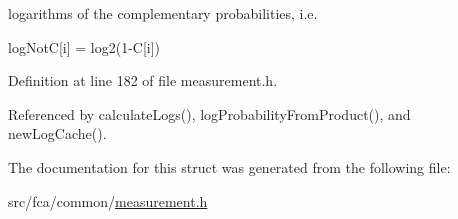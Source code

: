 logarithms of the complementary probabilities, i.\-e. 

log\-Not\-C\mbox{[}i\mbox{]} = log2(1-\/\-C\mbox{[}i\mbox{]}) 

\-Definition at line 182 of file measurement.\-h.



\-Referenced by calculate\-Logs(), log\-Probability\-From\-Product(), and new\-Log\-Cache().



\-The documentation for this struct was generated from the following file\-:\begin{DoxyCompactItemize}
\item 
src/fca/common/\hyperlink{common_2measurement_8h}{measurement.\-h}\end{DoxyCompactItemize}
